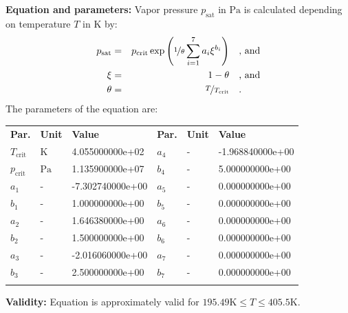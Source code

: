 \textbf{Equation and parameters:}
\newline
%
Vapor pressure $p_\mathrm{sat}$ in $\si{\pascal}$ is calculated depending on temperature $T$ in $\si{\kelvin}$ by:
%
\begin{equation*}
\begin{split}
p_\mathrm{sat} &=& p_\mathrm{crit} \exp \left( \nicefrac{1}{\theta} \sum_{i=1}^{7} a_i \xi^{b_i} \right) & \quad\text{, and} \\
\xi &=& 1 - \theta & \quad\text{, and} \\
\theta &=& \nicefrac{T}{T_\mathrm{crit}} & \quad\text{.}
\end{split}
\end{equation*}
%
The parameters of the equation are:
%
\begin{longtable}[l]{lll|lll}
\toprule
\addlinespace
\textbf{Par.} & \textbf{Unit} & \textbf{Value} &	\textbf{Par.} & \textbf{Unit} & \textbf{Value} \\
\addlinespace
\midrule
\endhead

\bottomrule
\endfoot
\bottomrule
\endlastfoot
\addlinespace

$T_\mathrm{crit}$ & $\si{\kelvin}$ & 4.055000000e+02 & $a_4$ & - & -1.968840000e+00 \\
$p_\mathrm{crit}$ & $\si{\pascal}$ & 1.135900000e+07 & $b_4$ & - & 5.000000000e+00 \\
$a_1$ & - & -7.302740000e+00 & $a_5$ & - & 0.000000000e+00 \\
$b_1$ & - & 1.000000000e+00 & $b_5$ & - & 0.000000000e+00 \\
$a_2$ & - & 1.646380000e+00 & $a_6$ & - & 0.000000000e+00 \\
$b_2$ & - & 1.500000000e+00 & $b_6$ & - & 0.000000000e+00 \\
$a_3$ & - & -2.016060000e+00 & $a_7$ & - & 0.000000000e+00 \\
$b_3$ & - & 2.500000000e+00 & $b_7$ & - & 0.000000000e+00 \\

\addlinespace\end{longtable}

\textbf{Validity:}
\newline
Equation is approximately valid for $195.49 \si{\kelvin} \leq T \leq 405.5 \si{\kelvin}$.
\newline


